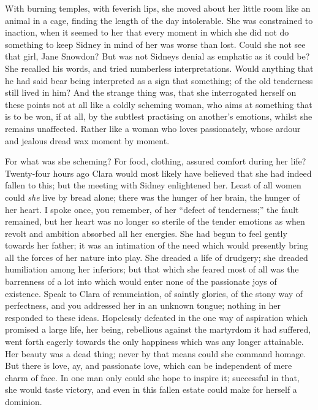{}With burning temples, with feverish lips, she moved about her little
room like an animal in a cage, finding the length of the day
intolerable. She was constrained to inaction, when it seemed to her that
every moment in which she did not do something to keep Sidney in mind of
her was worse than lost. Could she not see that girl, Jane Snowdon? But
was not Sidneys denial as emphatic as it could be? She recalled his
words, and tried numberless interpretations. Would anything that he had
said bear being interpreted as a sign that something; of the old
tenderness still lived in him? And the strange thing was, that she
interrogated herself on these points not at all like a coldly scheming
woman, who aims at something that is to be won, if at all, by the
subtlest practising on another's emotions, whilst she remains
unaffected. Rather like a woman who loves passionately, whose ardour and
jealous dread wax moment by moment.

For what was she scheming? For food, clothing, assured comfort during
her life? Twenty-four hours ago Clara would most likely have believed
that she had indeed fallen to this; but the meeting with Sidney
{}enlightened her. Least of all women could \emph{she} live by bread
alone; there was the hunger of her brain, the hunger of her heart. I
spoke once, you remember, of her ``defect of tenderness;'' the fault
remained, but her heart was no longer so sterile of the tender emotions
as when revolt and ambition absorbed all her energies. She had begun to
feel gently towards her father; it was an intimation of the need which
would presently bring all the forces of her nature into play. She
dreaded a life of drudgery; she dreaded humiliation among her inferiors;
but that which she feared most of all was the barrenness of a lot into
which would enter none of the passionate joys of existence. Speak to
Clara of renunciation, of saintly glories, of the stony way of
perfectness, and you addressed her in an unknown tongue; nothing in her
responded to these ideas. Hopelessly defeated in the one way of
aspiration which promised a large life, her being, rebellious against
the martyrdom it had suffered, went forth eagerly towards the only
happiness which was any longer attainable. Her beauty was a dead thing;
never by that means could she command homage. But there is love, ay,
{}and passionate love, which can be independent of mere charm of face.
In one man only could she hope to inspire it; successful in that, she
would taste victory, and even in this fallen estate could make for
herself a dominion.


